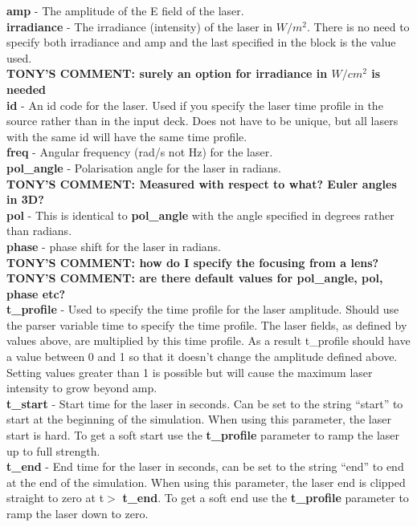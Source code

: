 \documentclass[12pt,a4paper]{article}
\newcommand{\emphtext}{\color{warwickdark} \fontfamily{phv}\selectfont\large\bf}
\newcommand{\inlineemph}[1]{{\color{warwicklight} \bf{#1}}}
\newcommand{\EPOCH}{{\color{warwickdark}\fontfamily{phv}\selectfont{EPOCH}}}
\newcommand{\tony}[1]{{\color{warwickred} \bf{TONY'S COMMENT:} \bf{#1}}\\}
\begin{document}
{\emphtext amp} - The amplitude of the E field of the laser.\\

{\emphtext irradiance} - The irradiance (intensity) of the laser in $W/m^2$.
There is no need to specify both irradiance and amp and the last specified
in the block is the value used.\\
\tony{surely an option for irradiance in $W/cm^2$ is needed}

{\emphtext id} - An id code for the laser. Used if you specify the laser time
profile in the {\EPOCH} source rather than in the input deck. Does not have to
be unique, but all lasers with the same id will have the same time profile.\\

{\emphtext freq} - Angular frequency (rad/s not Hz) for the laser.\\

{\emphtext pol\_angle} - Polarisation angle for the laser in radians.\\
\tony{Measured with respect to what? Euler angles in 3D?}

{\emphtext pol} - This is identical to \inlineemph{pol\_angle} with the angle
specified in degrees rather than radians.\\

{\emphtext phase} - phase shift for the laser in radians.\\
\tony{how do I specify the focusing from a lens?}
\tony{are there default values for pol\_angle, pol, phase etc?}

{\emphtext t\_profile} - Used to specify the time profile for the laser
amplitude. Should
use the parser variable time to specify the time profile. The laser fields, as
defined by values above, are multiplied by this time profile. As a result
t\_profile should have a value between 0 and 1 so that it doesn't change
the amplitude defined above.
Setting values
greater than 1 is possible but will cause the maximum laser intensity to grow
beyond amp.\\

{\emphtext t\_start} - Start time for the laser in seconds. Can be set to the
string ``start'' to start at the beginning of the simulation. When using this
parameter, the laser start is hard. To get a soft start use the
\inlineemph{t\_profile} parameter to ramp the laser up to full strength.\\

{\emphtext t\_end} - End time for the laser in seconds, can be set to the
string ``end'' to end at the end of the simulation. When using this parameter,
the laser end is clipped straight to zero at t$>$\inlineemph{t\_end}. To get a
soft end use the \inlineemph{t\_profile} parameter to ramp the laser down to
zero.\\
\end{document}
